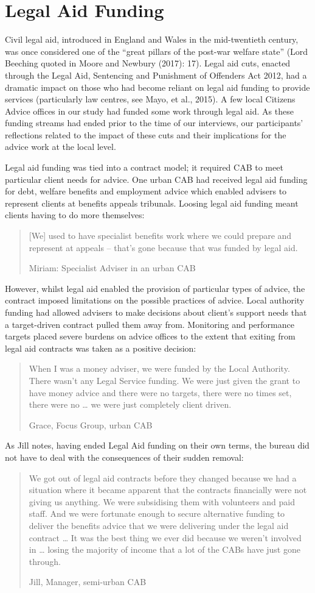 \section{Legal Aid Funding}
Civil legal aid, introduced in England and Wales in the mid-twentieth century, was once considered one of the “great pillars of the post-war welfare state” (Lord Beeching quoted in Moore and Newbury (2017): 17). Legal aid cuts, enacted through the Legal Aid, Sentencing and Punishment of Offenders Act 2012, had a dramatic impact on those who had become reliant on legal aid funding to provide services (particularly law centres, see Mayo, et al., 2015). A few local Citizens Advice offices in our study had funded some work through legal aid. As these funding streams had ended prior to the time of our interviews, our participants’ reflections related to the impact of these cuts and their implications for the advice work at the local level. 
\par
Legal aid funding was tied into a contract model; it required CAB to meet particular client needs for advice. One urban CAB had received legal aid funding for debt, welfare benefits and employment advice which enabled advisers to represent clients at benefits appeals tribunals. Loosing legal aid funding meant clients having to do more themselves:
    \blockquote[Miriam: Specialist Adviser in an urban CAB] {[We] used to have specialist benefits work where we could prepare and represent at appeals – that’s gone because that was funded by legal aid.}
However, whilst legal aid enabled the provision of particular types of advice, the contract imposed limitations on the possible practices of advice. Local authority funding had allowed advisers to make decisions about client’s support needs that a target-driven contract pulled them away from. Monitoring and performance targets placed severe burdens on advice offices to the extent that exiting from legal aid contracts was taken as a positive decision:
    \blockquote[Grace, Focus Group, urban CAB]{When I was a money adviser, we were funded by the Local Authority. There wasn’t any Legal Service funding. We were just given the grant to have money advice and there were no targets, there were no times set, there were no … we were just completely client driven.}
As Jill notes, having ended Legal Aid funding on their own terms, the bureau did not have to deal with the consequences of their sudden removal:
    \blockquote[Jill, Manager, semi-urban CAB]{We got out of legal aid contracts before they changed because we had a situation where it became apparent that the contracts financially were not giving us anything.  We were subsidising them with volunteers and paid staff.  And we were fortunate enough to secure alternative funding to deliver the benefits advice that we were delivering under the legal aid contract … It was the best thing we ever did because we weren’t involved in … losing the majority of income that a lot of the CABs have just gone through.}
